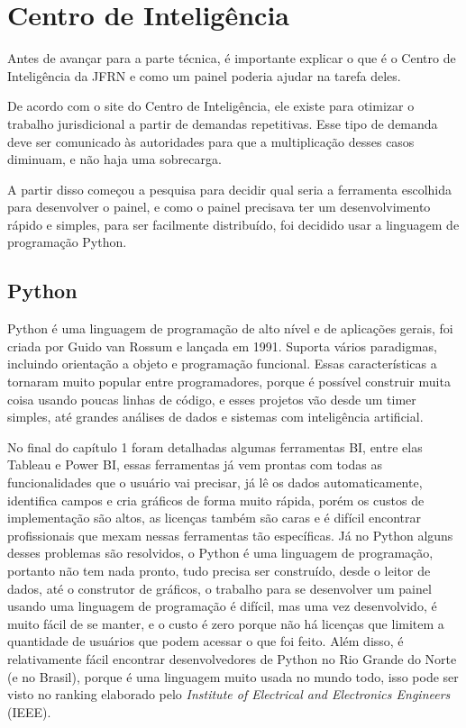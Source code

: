 \chapter{Centro de Inteligência}\label{cap_trabalho_academico}

Antes de avançar para a parte técnica, é importante explicar o que é o Centro de Inteligência da JFRN e como um painel poderia ajudar na tarefa deles.

De acordo com o site do Centro de Inteligência, ele existe para otimizar o trabalho jurisdicional a partir de demandas repetitivas. Esse tipo de demanda deve ser comunicado às autoridades para que a multiplicação desses casos diminuam, e não haja uma sobrecarga. 

A partir disso começou a pesquisa para decidir qual seria a ferramenta escolhida para desenvolver o painel, e como o painel precisava ter um desenvolvimento rápido e simples, para ser facilmente distribuído, foi decidido usar a linguagem de programação Python.

\section{Python}

Python é uma linguagem de programação de alto nível e de aplicações gerais, foi criada por Guido van Rossum e lançada em 1991. Suporta vários paradigmas, incluindo orientação a objeto e programação funcional. Essas características a tornaram muito popular entre programadores, porque é possível construir muita coisa usando poucas linhas de código, e esses projetos vão desde um timer simples, até grandes análises de dados e sistemas com inteligência artificial.

No final do capítulo 1 foram detalhadas algumas ferramentas BI, entre elas Tableau e Power BI, essas ferramentas já vem prontas com todas as funcionalidades que o usuário vai precisar, já lê os dados automaticamente, identifica campos e cria gráficos de forma muito rápida, porém os custos de implementação são altos, as licenças também são caras e é difícil encontrar profissionais que mexam nessas ferramentas tão específicas. Já no Python alguns desses problemas são resolvidos, o Python é uma linguagem de programação, portanto não tem nada pronto, tudo precisa ser construído, desde o leitor de dados, até o construtor de gráficos, o trabalho para se desenvolver um painel usando uma linguagem de programação é difícil, mas uma vez desenvolvido, é muito fácil de se manter, e o custo é zero porque não há licenças que limitem a quantidade de usuários que podem acessar o que foi feito. Além disso, é relativamente fácil encontrar desenvolvedores de Python no Rio Grande do Norte (e no Brasil), porque é uma linguagem muito usada no mundo todo, isso pode ser visto no ranking elaborado pelo \textit{Institute of Electrical and Electronics Engineers} (IEEE).

